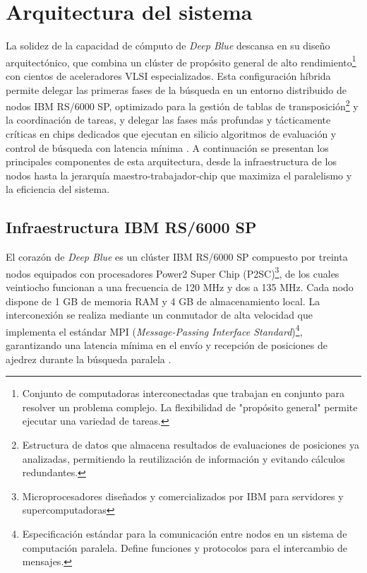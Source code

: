 \documentclass[a4paper, 12pt]{article}
\begin{document}
\section{Arquitectura del sistema}

La solidez de la capacidad de cómputo de \textit{Deep Blue} 
descansa en su diseño arquitectónico, que combina un clúster de 
propósito general de alto rendimiento\footnote{Conjunto de computadoras interconectadas que trabajan en conjunto para resolver un problema complejo. La flexibilidad de "propósito general" permite ejecutar una variedad de tareas.} 
con cientos de 
aceleradores VLSI especializados. Esta configuración híbrida 
permite delegar las primeras fases de la búsqueda en un entorno 
distribuido de nodos IBM RS/6000 SP, optimizado para la gestión 
de tablas de transposición\footnote{Estructura de datos que almacena resultados de evaluaciones de posiciones ya analizadas, permitiendo la reutilización de información y evitando cálculos redundantes.} 
y la coordinación de tareas, y 
delegar las fases más profundas y tácticamente críticas en chips 
dedicados que ejecutan en silicio algoritmos de evaluación y 
control de búsqueda con latencia mínima \cite{campbell2002deep}. 
A continuación se presentan los principales componentes de esta 
arquitectura, desde la infraestructura de los nodos hasta la 
jerarquía maestro-trabajador-chip que maximiza el paralelismo y 
la eficiencia del sistema.

\subsection{Infraestructura IBM RS/6000 SP}

El corazón de \textit{Deep Blue} es un clúster IBM RS/6000 SP 
compuesto por treinta nodos equipados con procesadores Power2 
Super Chip (P2SC)\footnote{Microprocesadores diseñados y comercializados por IBM para servidores y supercomputadoras}, 
de los cuales veintiocho funcionan a una 
frecuencia de 120 MHz y dos a 135 MHz. Cada nodo dispone de 1 GB 
de memoria RAM y 4 GB de almacenamiento local. La interconexión 
se realiza mediante un conmutador de alta velocidad que 
implementa el estándar MPI (\emph{Message-Passing Interface Standard})\footnote{Especificación estándar para la comunicación entre nodos en un sistema de computación paralela. Define funciones y protocolos para el intercambio de mensajes.}, 
garantizando una latencia mínima en 
el envío y recepción de posiciones de ajedrez durante la 
búsqueda paralela \cite{campbell2002deep, hsu1999ibm}.
\end{document}
